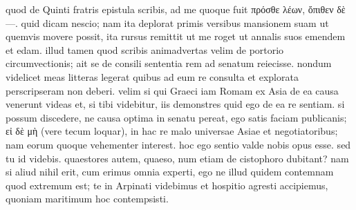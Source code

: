  quod de Quinti fratris epistula scribis, ad me quoque fuit πρόσθε λέων, ὄπιθεν δὲ —. quid dicam nescio; nam ita deplorat primis versibus mansionem suam ut quemvis movere possit, ita rursus remittit ut me roget ut annalis suos emendem et edam. illud tamen quod scribis animadvertas velim de portorio circumvectionis; ait se de consili sententia rem ad senatum reiecisse. nondum videlicet meas litteras legerat quibus ad eum re consulta et explorata perscripseram non deberi. velim si qui Graeci iam Romam ex Asia de ea causa venerunt videas et, si tibi videbitur, iis demonstres quid ego de ea re sentiam. si possum discedere, ne causa optima in senatu pereat, ego satis faciam publicanis; εἰ δὲ μὴ (vere tecum loquar), in hac re malo universae Asiae et negotiatoribus; nam eorum quoque vehementer interest. hoc ego sentio valde nobis opus esse. sed tu id videbis. quaestores autem, quaeso, num etiam de cistophoro dubitant? nam si aliud nihil erit, cum erimus omnia experti, ego ne illud quidem contemnam quod extremum est; te in Arpinati videbimus et hospitio agresti accipiemus, quoniam maritimum hoc contempsisti.
